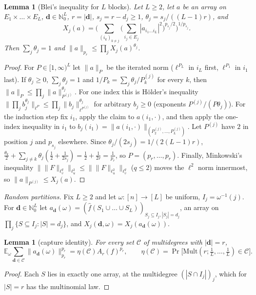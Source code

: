 \documentclass[11pt]{amsart}
\newtheorem{lemma}[theorem]{Lemma}
\theoremstyle{definition}
\newcommand{\N}{\mathbb{N}}
\newcommand{\E}{\mathbb{E}}
\newcommand{\hf}{\widehat f}
\newcommand{\bd}{\mathbf d}
\begin{document}
\begin{lemma}[Blei's inequality for $L$ blocks]\label{lem:blei}
Let $L\ge2$, let $a$ be an array on $E_1\times\dots\times E_L$, $\bd\in\N_0^L$, $r=|\bd|$, $s_j=r-d_j\ge1$, $\theta_j=s_j/((L-1)r)$, and
\[
X_j(a)=\Big(\sum_{(i_k)_{k\ne j}}\Big(\sum_{i_j\in E_j}|a_{i_1\dots i_L}|^2\Big)^{p_{s_j}/2}\Big)^{1/p_{s_j}} .
\]
Then $\sum_j\theta_j=1$ and $\|a\|_{p_r}\le\prod_jX_j(a)^{\theta_j}$.
\end{lemma}

\begin{proof}
For $P\in[1,\infty)^L$ let $\|a\|_P$ be the iterated norm ($\ell^{P_L}$ in $i_L$ first, $\ell^{P_1}$ in $i_1$ last). If $\theta_j\ge0$, $\sum_j\theta_j=1$ and $1/P_k=\sum_j\theta_j/P^{(j)}_k$ for every $k$, then $\|a\|_P\le\prod_j\|a\|_{P^{(j)}}^{\theta_j}$. For one index this is H\"older's inequality $\|\prod_jb_j^{\theta_j}\|_{\ell^{P}}\le\prod_j\|b_j\|_{\ell^{P^{(j)}}}^{\theta_j}$ for arbitrary $b_j\ge0$ (exponents $P^{(j)}/(P\theta_j)$). For the induction step fix $i_1$, apply the claim to $a(i_1,\cdot)$, and then apply the one-index inequality in $i_1$ to $b_j(i_1)=\|a(i_1,\cdot)\|_{(P^{(j)}_2,\dots,P^{(j)}_L)}$. Let $P^{(j)}$ have $2$ in position $j$ and $p_{s_j}$ elsewhere. Since $\theta_j/(2s_j)=1/(2(L-1)r)$,
$\frac{\theta_k}2+\sum_{j\ne k}\theta_j(\frac12+\frac1{2s_j})=\frac12+\frac1{2r}=\frac1{p_r}$, so $P=(p_r,\dots,p_r)$. Finally, Minkowski's inequality $\|\|F\|_{\ell^q_v}\|_{\ell^2_u}\le\|\|F\|_{\ell^2_u}\|_{\ell^q_v}$ ($q\le2$) moves the $\ell^2$ norm innermost, so $\|a\|_{P^{(j)}}\le X_j(a)$.
\end{proof}

\smallskip\noindent\emph{Random partitions.} Fix $L\ge2$ and let $\omega:[n]\to[L]$ be uniform, $I_j=\omega^{-1}(j)$. For $\bd\in\N_0^L$ let $a_\bd(\omega)=(\hf(S_1\cup\dots\cup S_L))_{S_j\subseteq I_j,|S_j|=d_j}$, an array on $\prod_j\{S\subseteq I_j:|S|=d_j\}$, and $X_j(\bd,\omega)=X_j(a_\bd(\omega))$.

\begin{lemma}[capture identity]\label{lem:capture}
For every set $\mathcal C$ of multidegrees with $|\bd|=r$,
\[
\E_\omega\sum_{\bd\in\mathcal C}\|a_\bd(\omega)\|_{p_r}^{p_r}=\eta(\mathcal C)A_r(f)^{p_r},\qquad \eta(\mathcal C)=\Pr\big[\mathrm{Mult}(r;\tfrac1L,\dots,\tfrac1L)\in\mathcal C\big].
\]
\end{lemma}

\begin{proof}
Each $S$ lies in exactly one array, at the multidegree $(|S\cap I_j|)_j$, which for $|S|=r$ has the multinomial law.
\end{proof}
\end{document}
